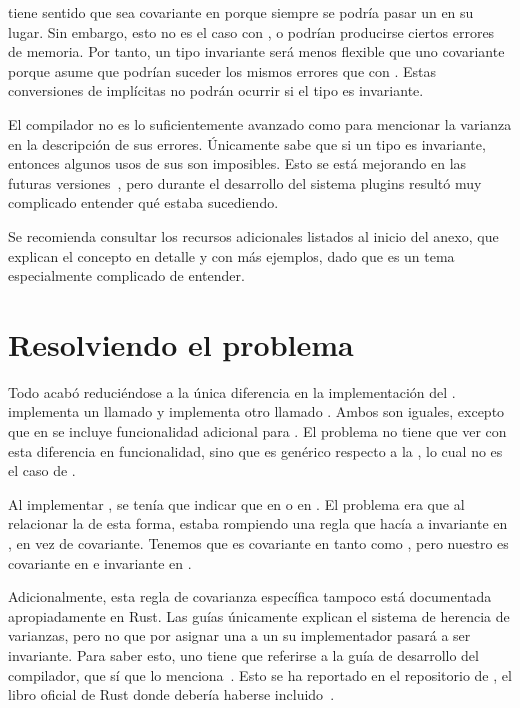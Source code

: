  tiene sentido que sea covariante en  porque
siempre se podría pasar un  en su lugar. Sin embargo, esto no
es el caso con , o podrían producirse ciertos errores de
memoria. Por tanto, un tipo invariante será menos flexible que uno covariante
porque asume que podrían suceder los mismos errores que con .
Estas conversiones de \lifetimes implícitas no podrán ocurrir si el tipo es
invariante.

El compilador no es lo suficientemente avanzado como para mencionar la varianza
en la descripción de sus errores. Únicamente sabe que si un tipo es invariante,
entonces algunos usos de sus \lifetimes son imposibles. Esto se está mejorando
en las futuras versiones~\cite{smarterchecker}, pero durante el desarrollo del
sistema plugins resultó muy complicado entender qué estaba sucediendo.

Se recomienda consultar los recursos adicionales listados al inicio del anexo,
que explican el concepto en detalle y con más ejemplos, dado que es un tema
especialmente complicado de entender.

\section{Resolviendo el problema}

Todo acabó reduciéndose a la única diferencia en la implementación del \trait
{}.  implementa un \trait llamado
 y  implementa otro llamado
. Ambos \traits son iguales, excepto que en 
se incluye funcionalidad adicional para \abistable. El problema no tiene que ver
con esta diferencia en funcionalidad, sino que  es
genérico respecto a la \lifetime {}, lo cual no es el caso de
.

Al implementar , se tenía que indicar que  en
 o  en . El problema era que al
relacionar la \lifetime {} de esta forma, estaba rompiendo una regla que
hacía a  invariante en , en vez de covariante. Tenemos que
 es covariante en tanto  como , pero nuestro
 es covariante en  e invariante en .

Adicionalmente, esta regla de covarianza específica tampoco está documentada
apropiadamente en Rust. Las guías únicamente explican el sistema de herencia de
varianzas, pero no que por asignar una \lifetime a un \trait su implementador
pasará a ser invariante. Para saber esto, uno tiene que referirse a la guía de
desarrollo del compilador, que sí que lo
menciona~\cite{associated_types_invariance}. Esto se ha reportado en el
repositorio de , el libro oficial de Rust donde debería
haberse incluido~\cite{nomicon_issue}.


